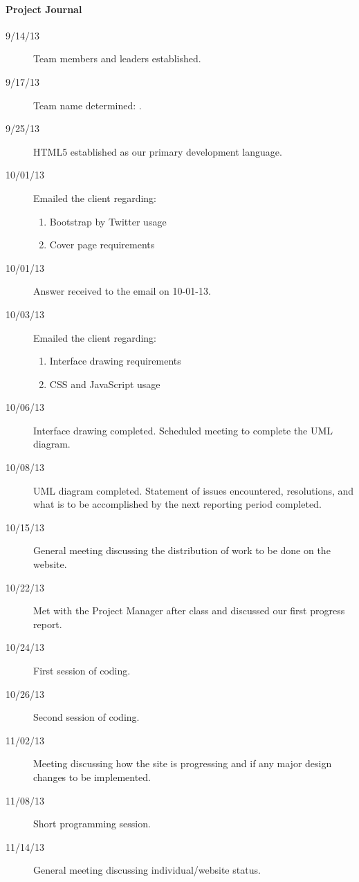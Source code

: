 

\singlespace

\paragraph{Project Journal}
\begin{description}
\item[9/14/13] Team members and leaders established.
\item[9/17/13] Team name determined: \emph\teamName.
\item[9/25/13] HTML5 established as our primary development language.
\item[10/01/13] Emailed the client regarding:
    \begin{enumerate}
        \item Bootstrap by Twitter usage
        \item Cover page requirements
    \end{enumerate}
\item[10/01/13] Answer received to the email on 10-01-13.
\item[10/03/13] Emailed the client regarding:
    \begin{enumerate}
        \item Interface drawing requirements
        \item CSS and JavaScript usage
    \end{enumerate}
\item[10/06/13] Interface drawing completed. Scheduled meeting to complete the UML diagram.
\item[10/08/13] UML diagram completed. Statement of issues encountered, resolutions, and 
                what is to be accomplished by the next reporting period completed.
\item[10/15/13] General meeting discussing the distribution of work to be done on the website.
\item[10/22/13] Met with the Project Manager after class and discussed our first progress report.
\item[10/24/13] First session of coding. 
\item[10/26/13] Second session of coding. 
\item[11/02/13] Meeting discussing how the site is progressing and if any major design changes to
                be implemented.
\item[11/08/13] Short programming session.
\item[11/14/13] General meeting discussing individual/website status. 
\end{description}
